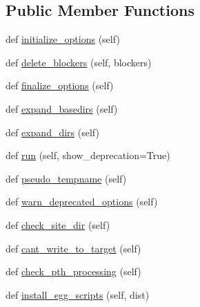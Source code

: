 \subsection*{Public Member Functions}
\begin{DoxyCompactItemize}
\item 
def \hyperlink{classsetuptools_1_1command_1_1easy__install_1_1easy__install_a2768394d7d0bb243e7ca4a8c037cc1e0}{initialize\+\_\+options} (self)
\item 
def \hyperlink{classsetuptools_1_1command_1_1easy__install_1_1easy__install_a99cead9791787d6acab9ec01d5505310}{delete\+\_\+blockers} (self, blockers)
\item 
def \hyperlink{classsetuptools_1_1command_1_1easy__install_1_1easy__install_a12cbd7f893894bedc60abf12b6cf8ab6}{finalize\+\_\+options} (self)
\item 
def \hyperlink{classsetuptools_1_1command_1_1easy__install_1_1easy__install_a0eca9f4b0239d5781b7eec6623f0669a}{expand\+\_\+basedirs} (self)
\item 
def \hyperlink{classsetuptools_1_1command_1_1easy__install_1_1easy__install_aa80f434db80539ca073e81f40d71ffb8}{expand\+\_\+dirs} (self)
\item 
def \hyperlink{classsetuptools_1_1command_1_1easy__install_1_1easy__install_a8c2f41e6e60c3702e69e833184c0acd0}{run} (self, show\+\_\+deprecation=True)
\item 
def \hyperlink{classsetuptools_1_1command_1_1easy__install_1_1easy__install_aa7c979df711868e4d4b39cc41a0231c8}{pseudo\+\_\+tempname} (self)
\item 
def \hyperlink{classsetuptools_1_1command_1_1easy__install_1_1easy__install_a05a8fc40f1fd15b3bbe7a8615e5e3716}{warn\+\_\+deprecated\+\_\+options} (self)
\item 
def \hyperlink{classsetuptools_1_1command_1_1easy__install_1_1easy__install_a8f2594512e012accd690c8c1d8188cd9}{check\+\_\+site\+\_\+dir} (self)
\item 
def \hyperlink{classsetuptools_1_1command_1_1easy__install_1_1easy__install_acf85cf14b68a1509b1c0d64d5cde9fab}{cant\+\_\+write\+\_\+to\+\_\+target} (self)
\item 
def \hyperlink{classsetuptools_1_1command_1_1easy__install_1_1easy__install_a3f116d374421c4d34fc75bdd96952f39}{check\+\_\+pth\+\_\+processing} (self)
\item 
def \hyperlink{classsetuptools_1_1command_1_1easy__install_1_1easy__install_a9f5abab719e7bae26b43d2f823bc52c0}{install\+\_\+egg\+\_\+scripts} (self, dist)
\item 

\end{DoxyCompactItemize}
